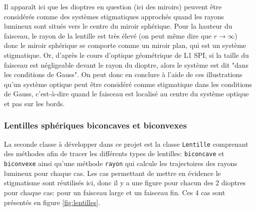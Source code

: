 \documentclass[a4paper, 11pt]{article}
\begin{document}
Il apparaît ici que les dioptres en question (ici des miroirs) peuvent être considérés comme des systèmes stigmatiques approchés quand les rayons lumineux sont situés vers le centre du miroir sphérique. Pour la hauteur du faisceau, le rayon de la lentille est très élevé (on peut même dire que $r \longrightarrow \infty$) donc le miroir sphérique se comporte comme un miroir plan, qui est un système stigmatique. Or, d'après le cours d'optique géométrique de L1 SPI, si la taille du faisceau est négligeable devant le rayon du dioptre, alors le système est dit "dans les conditions de Gauss". On peut donc en conclure à l'aide de ces illustrations qu'un système optique peut être considéré comme stigmatique dans les conditions de Gauss, c'est-à-dire quand le faisceau est localisé au centre du système optique et pas sur les bords.


\subsubsection{Lentilles sphériques biconcaves et biconvexes}
La seconde classe à développer dans ce projet est la classe \verb|Lentille| comprenant des méthodes afin de tracer les différents types de lentilles: \verb|biconcave| et \verb|biconvexe| ainsi qu'une méthode \verb|rayon| qui calcule les trajectoires des rayons lumineux pour chaque cas. Les cas permettant de mettre en évidence le stigmatisme sont réutilisés ici, donc il y a une figure pour chacun des 2 dioptres pour chaque cas: pour un faisceau large et un faisceau fin. Ces 4 cas sont présentés en figure \ref{fig:lentilles}. 
\end{document}
